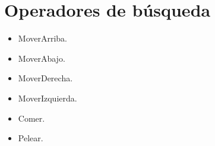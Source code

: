 \section{Operadores de búsqueda}

\begin{itemize}
\item MoverArriba.
\item MoverAbajo.
\item MoverDerecha.
\item MoverIzquierda.
\item Comer.
\item Pelear.
\end{itemize}

